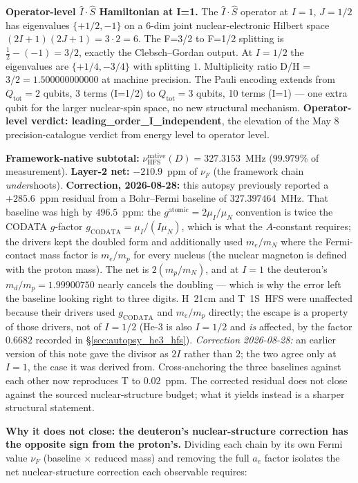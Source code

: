 \documentclass[11pt]{article}
\begin{document}
\textbf{Operator-level $\hat{I}\cdot\hat{S}$ Hamiltonian at I=1.}
The $\hat{I}\cdot\hat{S}$ operator at $I=1$, $J=1/2$ has eigenvalues
$\{+1/2, -1\}$ on a 6-dim joint nuclear-electronic Hilbert space
$(2I+1)(2J+1) = 3 \cdot 2 = 6$.  The F=3/2 to F=1/2 splitting is
$\frac{1}{2} - (-1) = 3/2$, exactly the Clebsch--Gordan output.  At
$I=1/2$ the eigenvalues are $\{+1/4, -3/4\}$ with splitting $1$.
Multiplicity ratio D/H = $3/2 = 1.500000000000$ at machine precision.
The Pauli encoding extends from $Q_\text{tot}=2$ qubits, 3 terms
(I=1/2) to $Q_\text{tot}=3$ qubits, 10 terms (I=1) --- one extra
qubit for the larger nuclear-spin space, no new structural mechanism.
\textbf{Operator-level verdict: leading\_order\_I\_independent}, the
elevation of the May 8 precision-catalogue verdict from energy level
to operator level.

\textbf{Framework-native subtotal:} $\nu_\text{HFS}^\text{native}(D) =
327.3153$~MHz ($99.979\%$ of measurement).  \textbf{Layer-2 net:}
$-210.9$~ppm of $\nu_F$ (the framework chain \emph{under}shoots).
\textbf{Correction, 2026-08-28:} this autopsy previously reported a
$+285.6$~ppm residual from a Bohr--Fermi baseline of $327.397464$~MHz.
That baseline was high by $496.5$~ppm: the $g^\text{atomic} = 2\mu_I/\mu_N$
convention is twice the CODATA $g$-factor
$g_\text{CODATA} = \mu_I/(I\mu_N)$, which is what the $A$-constant
requires; the drivers kept the doubled form and additionally used
$m_e/m_N$ where the Fermi-contact mass factor is $m_e/m_p$ for every
nucleus (the nuclear magneton is defined with the proton mass).  The net
is $2(m_p/m_N)$, and at $I=1$ the deuteron's $m_d/m_p = 1.99900750$
nearly cancels the doubling --- which is why the error left the baseline
looking right to three digits.  H~21cm and T~1S~HFS were unaffected
because their drivers used $g_\text{CODATA}$ and $m_e/m_p$ directly;
the escape is a property of those drivers, not of $I=1/2$ (He-3 is also
$I=1/2$ and \emph{is} affected, by the factor $0.6682$ recorded in
\S\ref{sec:autopsy_he3_hfs}).  \emph{Correction 2026-08-28:} an earlier
version of this note gave the divisor as $2I$ rather than $2$; the two
agree only at $I=1$, the case it was derived from.
Cross-anchoring the three baselines against each other now reproduces T
to $0.02$~ppm.  The corrected residual does not close against the
sourced nuclear-structure budget; what it yields instead is a sharper
structural statement.

\medskip\noindent\textbf{Why it does not close: the deuteron's
nuclear-structure correction has the opposite sign from the proton's.}
Dividing each chain by its own Fermi value $\nu_F$ (baseline $\times$
reduced mass) and removing the full $a_e$ factor isolates the net
nuclear-structure correction each observable requires:
\end{document}

